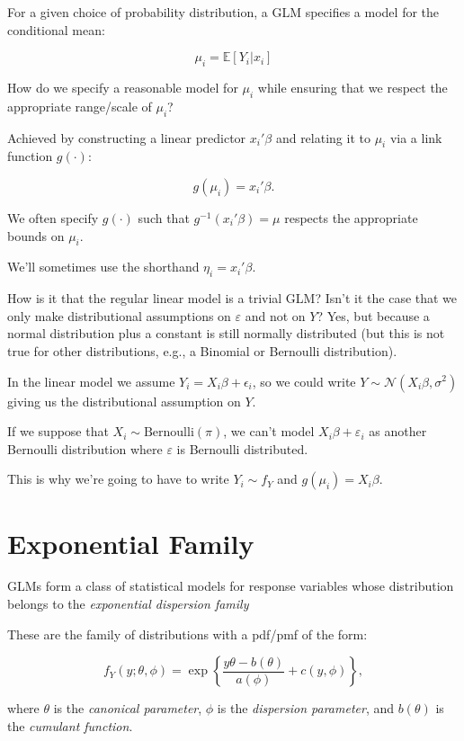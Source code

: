 \documentclass[
  letterpaper,
  DIV=11,
  numbers=noendperiod]{scrreport}
\begin{document}
For a given choice of probability distribution, a GLM specifies a model
for the conditional mean:

\[ \mu_i = \mathbb E[Y_i | x_i] \]

How do we specify a reasonable model for \(\mu_i\) while ensuring that
we respect the appropriate range/scale of \(\mu_i\)?

Achieved by constructing a linear predictor \(x_i' \beta\) and relating
it to \(\mu_i\) via a link function \(g(\cdot)\):

\[g(\mu_i) = x_i' \beta.\]

We often specify \(g(\cdot)\) such that \(g^{-1}(x_i' \beta) = \mu\)
respects the appropriate bounds on \(\mu_i\).

We'll sometimes use the shorthand \(\eta_i = x_i' \beta\).

How is it that the regular linear model is a trivial GLM? Isn't it the
case that we only make distributional assumptions on \(\varepsilon\) and
not on \(Y\)? Yes, but because a normal distribution plus a constant is
still normally distributed (but this is not true for other
distributions, e.g., a Binomial or Bernoulli distribution).

In the linear model we assume \(Y_i = X_i \beta + \epsilon_i\), so we
could write \(Y \sim \mathcal N(X_i \beta, \sigma^2)\) giving us the
distributional assumption on \(Y\).

If we suppose that \(X_i \sim \text{Bernoulli}(\pi)\), we can't model
\(X_i \beta + \varepsilon_i\) as another Bernoulli distribution where
\(\varepsilon\) is Bernoulli distributed.

This is why we're going to have to write \(Y_i \sim f_Y\) and
\(g(\mu_i) = X_i \beta\).

\hypertarget{exponential-family}{%
\section{Exponential Family}\label{exponential-family}}

GLMs form a class of statistical models for response variables whose
distribution belongs to the \emph{exponential dispersion family}

These are the family of distributions with a pdf/pmf of the form:

\[f_Y(y; \theta, \phi) = \exp \left\{ \frac{y \theta - b(\theta)}{a(\phi)} + c(y, \phi) \right\},\]

where \(\theta\) is the \emph{canonical parameter}, \(\phi\) is the
\emph{dispersion parameter}, and \(b(\theta)\) is the \emph{cumulant
function}.
\end{document}
